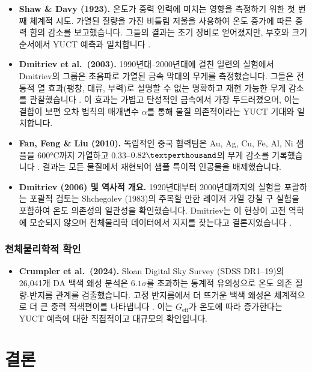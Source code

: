 \documentclass[11pt,a4paper]{article}
\begin{document}
	\begin{itemize}
		\item \textbf{Shaw \& Davy (1923).} 온도가 중력 인력에 미치는 영향을 측정하기 위한 첫 번째 체계적 시도. 가열된 질량을 가진 비틀림 저울을 사용하여 온도 증가에 따른 중력 힘의 감소를 보고했습니다. 그들의 결과는 초기 장비로 얻어졌지만, 부호와 크기 순서에서 YUCT 예측과 일치합니다 \cite{ShawDavy1923}.
		
		\item \textbf{Dmitriev et al.\ (2003).} 1990년대–2000년대에 걸친 일련의 실험에서 Dmitriev의 그룹은 초음파로 가열된 금속 막대의 무게를 측정했습니다. 그들은 전통적 열 효과(팽창, 대류, 부력)로 설명할 수 없는 명확하고 재현 가능한 무게 감소를 관찰했습니다 \cite{Dmitriev2003}. 이 효과는 가볍고 탄성적인 금속에서 가장 두드러졌으며, 이는 결합이 보편 오차 법칙의 매개변수 $\alpha$를 통해 물질 의존적이라는 YUCT 기대와 일치합니다.
		
		\item \textbf{Fan, Feng \& Liu (2010).} 독립적인 중국 협력팀은 Au, Ag, Cu, Fe, Al, Ni 샘플을 600°C까지 가열하고 $0.33$–$0.82\textperthousand$의 무게 감소를 기록했습니다 \cite{Fan2010}. 결과는 모든 물질에서 재현되어 샘플 특이적 인공물을 배제했습니다.
		
		\item \textbf{Dmitriev (2006) 및 역사적 개요.} 1920년대부터 2000년대까지의 실험을 포괄하는 포괄적 검토는 Shchegolev (1983)의 주목할 만한 레이저 가열 강철 구 실험을 포함하여 온도 의존성의 일관성을 확인했습니다. Dmitriev는 이 현상이 고전 역학에 모순되지 않으며 천체물리학 데이터에서 지지를 찾는다고 결론지었습니다 \cite{Dmitriev2006}.
	\end{itemize}
	
	\subsubsection*{천체물리학적 확인}
	
	\begin{itemize}
		\item \textbf{Crumpler et al.\ (2024).} Sloan Digital Sky Survey (SDSS DR1–19)의 26,041개 DA 백색 왜성 분석은 $6.1\sigma$를 초과하는 통계적 유의성으로 온도 의존 질량-반지름 관계를 검출했습니다. 고정 반지름에서 더 뜨거운 백색 왜성은 체계적으로 더 큰 중력 적색편이를 나타냅니다 \cite{Crumpler2024}. 이는 $G_{\mathrm{eff}}$가 온도에 따라 증가한다는 YUCT 예측에 대한 직접적이고 대규모의 확인입니다.
	\end{itemize}
	
	\section{결론}
	\label{sec:conclusion}
	
\end{document}
